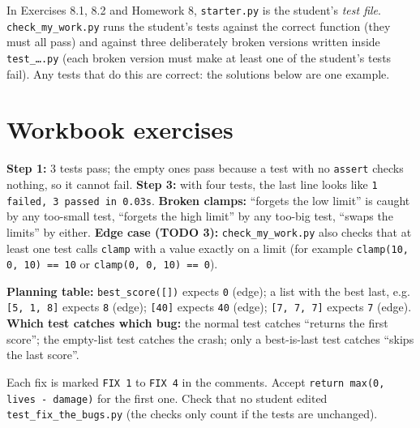 
\begin{teachernote}
In Exercises 8.1, 8.2 and Homework 8, \texttt{starter.py} is the student's \emph{test file}. \texttt{check\_my\_work.py} runs the student's
tests against the correct function (they must all pass) and against three deliberately broken versions written inside \texttt{test\_\ldots.py}
(each broken version must make at least one of the student's tests fail). Any tests that do this are correct: the solutions below are one example.
\end{teachernote}

\section{Workbook exercises}
\begin{answer}
\textbf{Step 1:} 3 tests pass; the empty ones pass because a test with no \texttt{assert} checks nothing, so it cannot fail.
\textbf{Step 3:} with four tests, the last line looks like \texttt{1 failed, 3 passed in 0.03s}. \textbf{Broken clamps:} \enquote{forgets the low limit} is caught by any
too-small test, \enquote{forgets the high limit} by any too-big test, \enquote{swaps the limits} by either.
\textbf{Edge case (TODO 3):} \texttt{check\_my\_work.py} also checks that at least one test calls \texttt{clamp} with a value exactly on a limit (for example \texttt{clamp(10, 0, 10) == 10} or \texttt{clamp(0, 0, 10) == 0}).
\end{answer}

\begin{answer}
\textbf{Planning table:} \texttt{best\_score([])} expects \texttt{0} (edge); a list with the best last, e.g. \texttt{[5, 1, 8]} expects \texttt{8} (edge);
\texttt{[40]} expects \texttt{40} (edge); \texttt{[7, 7, 7]} expects \texttt{7} (edge). \textbf{Which test catches which bug:} the normal test catches
\enquote{returns the first score}; the empty-list test catches the crash; only a best-is-last test catches \enquote{skips the last score}.
\end{answer}

\begin{answer}
Each fix is marked \texttt{FIX 1} to \texttt{FIX 4} in the comments. Accept \texttt{return max(0, lives - damage)} for the first one. Check that no student edited
\texttt{test\_fix\_the\_bugs.py} (the checks only count if the tests are unchanged).
\end{answer}

